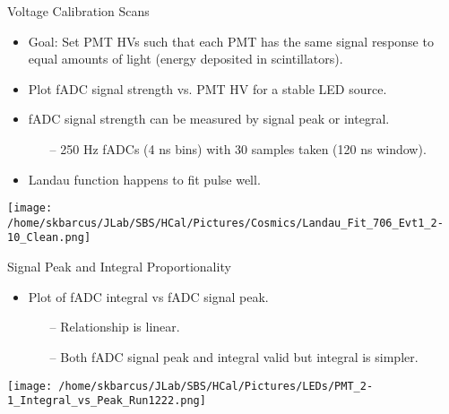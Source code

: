 \documentclass[10pt]{beamer}
\begin{document}
\begin{frame}{Voltage Calibration Scans}

	\begin{itemize}
		\item Goal: Set PMT HVs such that each PMT has the same signal response to equal amounts of light (energy deposited in scintillators).
		\item Plot fADC signal strength vs. PMT HV for a stable LED source.
		\item fADC signal strength can be measured by signal peak or integral.
		\begin{itemize}
			\item[--] 250 Hz fADCs (4 ns bins) with 30 samples taken (120 ns window).
		\end{itemize}
		\item Landau function happens to fit pulse well.
	\end{itemize}

	\begin{center}
		\texttt{[image: /home/skbarcus/JLab/SBS/HCal/Pictures/Cosmics/Landau\_Fit\_706\_Evt1\_2-10\_Clean.png]}
  	\end{center}

\end{frame}

\begin{frame}{Signal Peak and Integral Proportionality}

	\begin{itemize}
		\item Plot of fADC integral vs fADC signal peak.
			\begin{itemize}
				\item[--] Relationship is linear.
				\item[--] Both fADC signal peak and integral valid but integral is simpler. 
			\end{itemize}
	\end{itemize}
	
	\begin{center}
		\texttt{[image: /home/skbarcus/JLab/SBS/HCal/Pictures/LEDs/PMT\_2-1\_Integral\_vs\_Peak\_Run1222.png]}
  	\end{center}

\end{frame}
\end{document}
